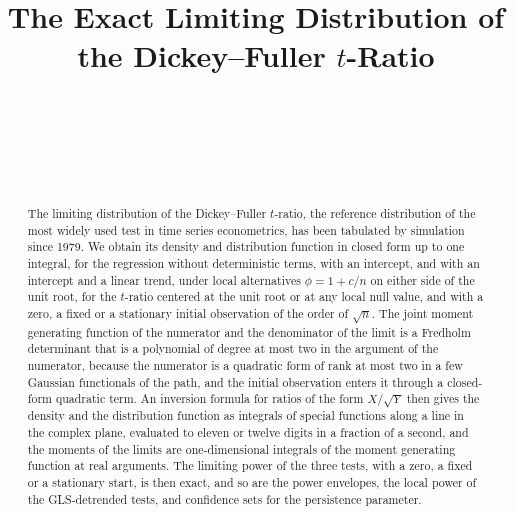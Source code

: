 \documentclass[ecta,nameyear,final]{econsocart}
\theoremstyle{plain}
\theoremstyle{definition}
\begin{document}
\begin{frontmatter}
\title{The Exact Limiting Distribution of the Dickey--Fuller $t$-Ratio}

\begin{aug}
\author[purdue]{~}
\author[hslu]{~}
\author[rotman,hkust]{~}
\address[purdue]{, }
\address[hslu]{, }
\address[rotman]{, }
\address[hkust]{, }
\end{aug}

\begin{abstract}
The limiting distribution of the Dickey--Fuller $t$-ratio, the reference distribution of the most widely used test in time series econometrics, has been tabulated by simulation since 1979.  We obtain its density and distribution function in closed form up to one integral, for the regression without deterministic terms, with an intercept, and with an intercept and a linear trend, under local alternatives $\phi=1+c/n$ on either side of the unit root, for the $t$-ratio centered at the unit root or at any local null value, and with a zero, a fixed or a stationary initial observation of the order of $\sqrt n$.  The joint moment generating function of the numerator and the denominator of the limit is a Fredholm determinant that is a polynomial of degree at most two in the argument of the numerator, because the numerator is a quadratic form of rank at most two in a few Gaussian functionals of the path, and the initial observation enters it through a closed-form quadratic term.  An inversion formula for ratios of the form $X/\sqrt Y$ then gives the density and the distribution function as integrals of special functions along a line in the complex plane, evaluated to eleven or twelve digits in a fraction of a second, and the moments of the limits are one-dimensional integrals of the moment generating function at real arguments.  The limiting power of the three tests, with a zero, a fixed or a stationary start, is then exact, and so are the power envelopes, the local power of the GLS-detrended tests, and confidence sets for the persistence parameter.
\end{abstract}

\begin{keyword}
\end{keyword}

\end{frontmatter}
\end{document}
